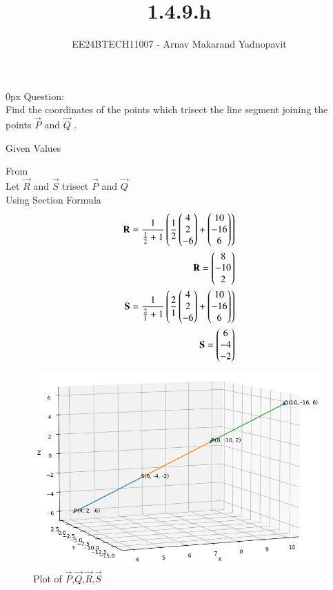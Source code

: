\documentclass[journal]{IEEEtran}
\begin{document}

\title{1.4.9.h}
\author{EE24BTECH11007 - Arnav Makarand Yadnopavit}
{\let\newpage\relax\maketitle}
\renewcommand{\thefigure}{\theenumi}
\renewcommand{\thetable}{\theenumi}
\setlength{\intextsep}{10pt} %
\renewcommand{\thetable}{\theenumi}
\parindent 0px
Question:\\
Find the coordinates of the points which trisect the line segment joining the points
$\vec{P}$  and $\vec{Q}$ .\\
\solution
\begin{table}[h]
    \centering
    
    \caption{Given Values}
    \label{tab:1}
\end{table}
From \\
Let $\vec{R}$ and $\vec{S}$ trisect $\vec{P}$ and $\vec{Q}$\\
Using Section Formula
\begin{align}
\mathbf{R}=\frac{1}{\frac{1}{2}+1}\left(\frac{1}{2}\begin{pmatrix}4\\2\\-6\end{pmatrix}+\begin{pmatrix}10\\-16\\6\end{pmatrix}\right)\\
\mathbf{R}=\begin{pmatrix}8\\-10\\2\end{pmatrix}\\
\mathbf{S}=\frac{1}{\frac{2}{1}+1}\left(\frac{2}{1}\begin{pmatrix}4\\2\\-6\end{pmatrix}+\begin{pmatrix}10\\-16\\6\end{pmatrix}\right)\\
\mathbf{S}=\begin{pmatrix}6\\-4\\-2\end{pmatrix}
\end{align}
\begin{figure}[h]
    \centering
    \includegraphics[width=\columnwidth]{figs/fig.png}
    \caption{Plot of $\vec{P}$,$\vec{Q}$,$\vec{R}$,$\vec{S}$}
 \end{figure}
\end{document}
